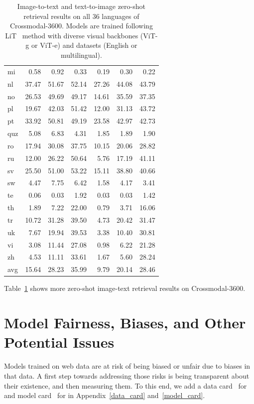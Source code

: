 \begin{table}[ht]
{\begin{tabular}{lrrrrrr}
mi & 0.58 & 0.92 & 0.33 & 0.19 & 0.30 & 0.22 \\
nl & 37.47 & 51.67 & 52.14 & 27.26 & 44.08 & 43.79 \\
no & 26.53 & 49.69 & 49.17 & 14.61 & 35.59 & 37.35 \\
pl & 19.67 & 42.03 & 51.42 & 12.00 & 31.13 & 43.72 \\
pt & 33.92 & 50.81 & 49.19 & 23.58 & 42.97 & 42.73 \\
quz & 5.08 & 6.83 & 4.31 & 1.85 & 1.89 & 1.90 \\
ro & 17.94 & 30.08 & 37.75 & 10.15 & 20.06 & 28.82 \\
ru & 12.00 & 26.22 & 50.64 & 5.76 & 17.19 & 41.11 \\
sv & 25.50 & 51.00 & 53.22 & 15.11 & 38.80 & 40.66 \\
sw & 4.47 & 7.75 & 6.42 & 1.58 & 4.17 & 3.41 \\
te & 0.06 & 0.03 & 1.92 & 0.03 & 0.03 & 1.42 \\
th & 1.89 & 7.22 & 22.00 & 0.79 & 3.71 & 16.06 \\
tr & 10.72 & 31.28 & 39.50 & 4.73 & 20.42 & 31.47 \\
uk & 7.67 & 19.94 & 39.53 & 3.38 & 10.40 & 30.81 \\
vi & 3.08 & 11.44 & 27.08 & 0.98 & 6.22 & 21.28 \\
zh & 4.53 & 11.11 & 33.61 & 1.67 & 5.60 & 28.24 \\
avg & 15.64 & 28.23 & 35.99 & 9.79 & 20.14 & 28.46 \\
\bottomrule
\end{tabular}}
\caption{Image-to-text and text-to-image zero-shot retrieval results on all 36 languages of Crossmodal-3600. Models are trained following LiT~\citep{lit} method with diverse visual backbones (ViT-g or ViT-e) and datasets (English or multilingual).}
\label{table:crossmodal_retrieval}
\end{table}
Table~\ref{table:crossmodal_retrieval} shows more zero-shot image-text retrieval results on Crossmodal-3600.

\section{Model Fairness, Biases, and Other Potential Issues}
\label{sec:fairness}

Models trained on web data are at risk of being biased or unfair due to biases in that data. A first step towards addressing those risks is being transparent about their existence, and then measuring them.
To this end, we add a data card~\citep{datacard} for \PTDATA and model card~\citep{mitchell-2019-model} for \NAME in Appendix~\ref{data_card} and~\ref{model_card}.

